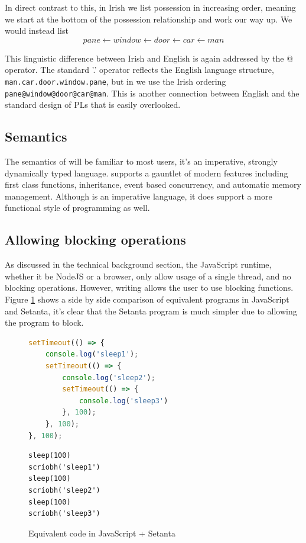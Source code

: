 In direct contrast to this, in Irish we list possession in increasing order, meaning we start at the bottom of the possession relationship and work our way up. We would instead list
\[pane \leftarrow window \leftarrow door \leftarrow car \leftarrow man\]

This linguistic difference between Irish and English is again addressed by the @ operator. The standard '.' operator reflects the English language structure, \verb|man.car.door.window.pane|, but in \Setanta{} we use the Irish ordering \verb|pane@window@door@car@man|. This is another connection between English and the standard design of PLs that is easily overlooked.

\subsection{Semantics}

The semantics of \Setanta{} will be familiar to most users, it's an imperative, strongly dynamically typed language. \Setanta{} supports a gauntlet of modern features including first class functions, inheritance, event based concurrency, and automatic memory management. Although \Setanta{} is an imperative language, it does support a more functional style of programming as well.

\subsection{Allowing blocking operations}

As discussed in the technical background section, the JavaScript runtime, whether it be NodeJS or a browser, only allow usage of a single thread, and no blocking operations. However, writing \Setanta{} allows the user to use blocking functions. Figure \ref{blockingcomparison} shows a side by side comparison of equivalent programs in JavaScript and Setanta, it's clear that the Setanta program is much simpler due to allowing the program to block.

\begin{figure}[ht]
    \begin{minipage}[t]{0.45\textwidth}
        \begin{lstlisting}[language=javascript, caption=JavaScript]
setTimeout(() => {
    console.log('sleep1');
    setTimeout(() => {
        console.log('sleep2');
        setTimeout(() => {
            console.log('sleep3')
        }, 100);
    }, 100);
}, 100);
        \end{lstlisting}
    \end{minipage}\qquad
    \begin{minipage}[t]{0.45\textwidth}
        \begin{lstlisting}[language=setanta, caption=Setanta]
sleep(100)
scríobh('sleep1')
sleep(100)
scríobh('sleep2')
sleep(100)
scríobh('sleep3')
        \end{lstlisting}
    \end{minipage}
    \caption{Equivalent code in JavaScript + Setanta}
    \label{blockingcomparison}
\end{figure}

